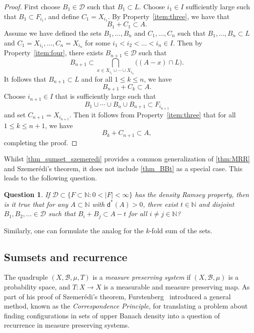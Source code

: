\documentclass[10pt,dvipsnames]{article}
\newtheorem{question}[theorem]{Question}
\theoremstyle{definition}
\theoremstyle{plain}
\newcommand{\define}[1]{\textit{#1}}
\newcommand{\N}{\mathbb{N}}
\newcommand{\CD}{\mathcal{D}}
\newcommand{\ubdens}{\mathsf{d}^*}
\newcommand{\Szemeredi}{Szemer\'{e}di}
\begin{document}
\begin{proof}
First choose $B_1\in\CD$ such that $B_1\subset L$. Choose $i_1\in I$ sufficiently large such that 
$B_1\subset F_{i_1}$, and  define $C_1 = X_{i_1}$.  By Property~\eqref{item:three}, we have that 
$$B_1+C_1\subset A.$$
Assume we have defined the sets $B_1, \ldots, B_n$ and $C_1, \ldots, C_n$ such that 
$B_1, \ldots, B_n\subset L$ and $C_1 = X_{i_1}, \ldots, C_n = X_{i_n}$ for some $i_1 < i_2 < \ldots <  i_n\in I$. 
Then by Property~\eqref{item:four}, there exists $B_{n+1}\in\CD$ such that 
\[
B_{n+1}\subset\bigcap_{x\in X_{i_1}\cup\cdots\cup X_{i_n}}\bigl((A-x)\cap L\bigr).
\]
It follows that $B_{n+1}\subset L$ and for all $1\leq k \leq n$, we have 
\[
B_{n+1}+C_k\subset A. \]
Choose $i_{n+1}\in I$ that is sufficiently large such that  
\[
B_1\cup \cdots \cup B_n\cup B_{n+1}\subset F_{i_{n+1}}
\]
and set $C_{n+1} = X_{i_{n+1}}$.  
Then it follows from Property~\eqref{item:three} that 
for all $1 \leq k \leq n+1$, we have
$$B_k+C_{n+1}\subset A, 
$$
completing the proof. 
\end{proof}


Whilst \cref{thm_sumset_szemeredi} provides a common generalization of \cref{thm:MRR} and \Szemeredi{}'s theorem, it does not include \cref{thm_BBt} as a special case.
This leads to the following question.

\begin{question}
\label{thm_BBt_szemeredi}
If $\CD\subset\{F\subset\N\colon 0 < |F|< \infty\}$ has the density Ramsey property, then is it true that for any $A\subset \N$ with $\ubdens(A)> 0$, there exist $t\in \N$ and disjoint 
$B_1, B_2, \ldots\in\CD$ such that $B_i+B_j\subset A-t$ for all $i\neq j\in\N$?  
\end{question}


Similarly, one can  formulate the analog for the $k$-fold sum of the sets.


\subsection{Sumsets and recurrence}
\label{sec:recurrence-and-sumset} 



The quadruple $(X,\mathcal{B},\mu,T)$ is a \define{measure preserving system} if $(X,\mathcal{B},\mu)$ is a probability space, and $T\colon X\to X$ is a measurable and measure preserving map.
As part of his proof of \Szemeredi{}'s theorem, Furstenberg~\cite{Furstenberg-1977} introduced a general method, known as the \define{Correspondence Principle}, for translating a problem about finding configurations in sets of upper Banach density into a question  of recurrence in measure preserving systems.
\end{document}
